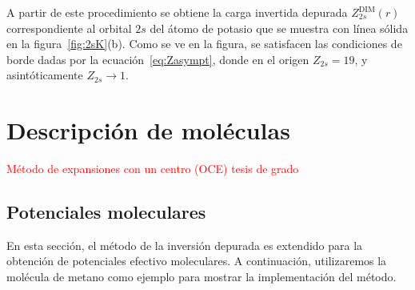 A partir de este procedimiento se obtiene la carga invertida depurada 
$Z_{2s}^{\mathrm{DIM}}(r)$ correspondiente al orbital $2s$ del átomo 
de potasio que se muestra con línea sólida en la figura~\ref{fig:2sK}(b).
Como se ve en la figura, se satisfacen las condiciones de borde dadas por
la ecuación~\ref{eq:Zasympt}, donde en el origen $Z_{2s} = 19$, y 
asintóticamente $Z_{2s} \rightarrow 1$.

\section{Descripción de moléculas}
\label{sec:moleculas}

\textcolor{red}{Método de expansiones con un centro (OCE) tesis de 
grado}

\subsection{Potenciales moleculares}
\label{sec:dimmoleculas}

En esta sección, el método de la inversión depurada es extendido para 
la obtención de potenciales efectivo moleculares. A continuación, 
utilizaremos la molécula de metano como ejemplo para mostrar la 
implementación del método.

